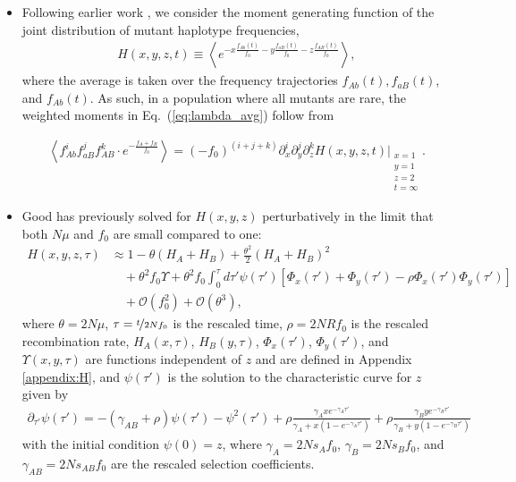 \documentclass[aps,rmp,twocolumn,groupedaddress,floatfix,notitlepage]{revtex4-1}
\begin{document}
\begin{itemize}
\item Following earlier work \parencite{good_2022, weissman_et_al_2009,weissman_et_al_2010,good_desai_2013,cvijovic_et_al_2018}, we consider the moment generating function of the joint distribution of mutant haplotype frequencies, 
\begin{align}\label{eq:H(x,y,z,t)}
    H(x, y, z, t) \equiv \left\langle e^{-x\frac{f_{Ab}(t)}{f_0}-y\frac{f_{aB}(t)}{f_0}-z\frac{f_{AB}(t)}{f_0}} \right\rangle,
\end{align}
where the average is taken over the frequency trajectories $f_{Ab}(t), f_{aB}(t)$, and $f_{Ab}(t)$. As such, in a population where all mutants are rare, the weighted moments in Eq.~(\ref{eq:lambda_avg}) follow from

\begin{align}\label{eq:lambda_moments}
    \left\langle f_{Ab}^if_{aB}^jf_{AB}^k\cdot e^{-\frac{f_{A}+f_{B}}{f_0}}\right\rangle
    = (-f_0)^{(i+j+k)} \partial_x^i \partial_y^j \partial_z^k H(x, y, z, t) \Bigg\vert_{\substack{x=1 \\ y=1 \\ z=2 \\ t=\infty}}.
\end{align}

\item Good \parencite{good_2022} has previously solved for $H(x, y, z)$ perturbatively in the limit that both $N\mu$ and $f_0$ are small compared to one:
\begin{align}\label{eq:h_expansion_main_text}
    H(x, y, z, \tau) &\approx 1 -\theta (H_A + H_B)
    + \frac{\theta^2}{2}\left(H_A + H_B\right)^2 \\\nonumber
    &\quad + \theta^2f_0\Upsilon + \theta^2f_0\int_0^{\tau}d \tau' \psi(\tau') \left[\Phi_x(\tau')+\Phi_y(\tau')-\rho\Phi_x(\tau')\Phi_y(\tau')\right]\\\nonumber
    &\quad + \mathcal{O}(f_0^2) +\mathcal{O}(\theta^3),
\end{align}
where $\theta = 2N\mu$, $\tau = \nicefrac{t}{2Nf_0}$ is the rescaled time, $\rho = 2NRf_0$ is the rescaled recombination rate, $H_A(x, \tau)$, $H_B(y, \tau)$, $\Phi_x(\tau')$, $\Phi_y(\tau')$, and $\Upsilon(x, y, \tau)$ are functions independent of $z$ and are defined in Appendix \ref{appendix:H}, and $\psi(\tau')$ is the solution to the characteristic curve for $z$ given by
\begin{align}\label{eq:psi_general_eq_main_text}
    \partial_{\tau'} \psi(\tau') = -(\gamma_{AB} + \rho) \psi(\tau') - \psi^2(\tau') + \rho \frac{\gamma_Axe^{-\gamma_A\tau'}}{\gamma_A+x(1-e^{-\gamma_A\tau'})} + \rho \frac{\gamma_Bye^{-\gamma_B\tau'}}{\gamma_B+y(1-e^{-\gamma_B\tau'})}
\end{align}
with the initial condition $\psi(0)=z$, where $\gamma_{A}=2Ns_
{A}f_0$, $\gamma_{B}=2Ns_
{B}f_0$, and $\gamma_{AB}=2Ns_
{AB}f_0$ are the rescaled selection coefficients.


\end{itemize}
\end{document}
